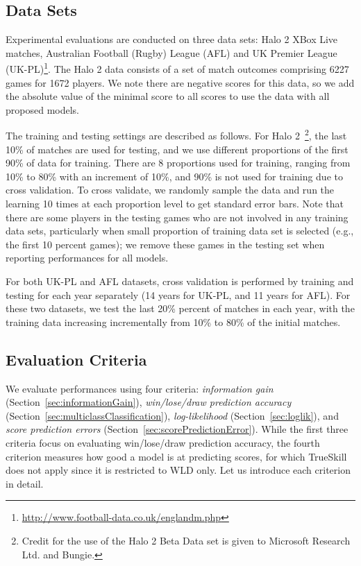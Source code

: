 \subsection{Data Sets}
\label{sec:data_sets}

Experimental evaluations are conducted on three data sets: Halo 2 XBox Live
matches, Australian Football
(Rugby) League (AFL)%
and UK
Premier League (UK-PL)\footnote{\noindent \url{http://www.football-data.co.uk/englandm.php}}.  The Halo 2 data consists of a
set of match outcomes comprising 6227 games for 1672 players. We note there are negative scores for this data, so we add the absolute value of the minimal score to all scores to use the data with all proposed models.

The training and testing settings are described as follows.  For Halo
2~\footnote{\noindent Credit for the use of the Halo 2 Beta Data set
is given to Microsoft Research Ltd. and Bungie.}, the last 10\%
of matches are used for testing, and we use different proportions of
the first 90\% of data for training. There are 8 proportions used
for training, ranging from 10\% to 80\% with an increment of
10\%, and 90\% is not used for training due to cross validation. To cross validate, we randomly sample the data and run the learning 10 times at each proportion level
to get standard error bars. Note that there are some players in the
testing games who are not involved in any training data sets,
particularly when small proportion of training data set is selected
(e.g., the first 10 percent games); we remove these games in the
testing set when reporting performances for all models.

For both UK-PL and AFL datasets, cross validation is performed by
training and testing for each year separately (14 years for UK-PL, and
11 years for AFL).  For these two datasets, we test the last 20\%
percent of matches in each year, with the training data increasing
incrementally from 10\% to 80\% of the initial matches.

\subsection{Evaluation Criteria}

We evaluate performances using four criteria: {\it information gain} (Section~\ref{sec:informationGain}), {\it win/lose/draw prediction accuracy} (Section~\ref{sec:multiclassClassification}), {\it log-likelihood} (Section~\ref{sec:loglik}), and {\it score prediction errors}
(Section~\ref{sec:scorePredictionError}).
While the first three criteria focus on evaluating win/lose/draw prediction accuracy, the fourth
criterion measures how good a model is at predicting scores, for which
TrueSkill does not apply since it is restricted to WLD only. Let us
introduce each criterion in detail.

